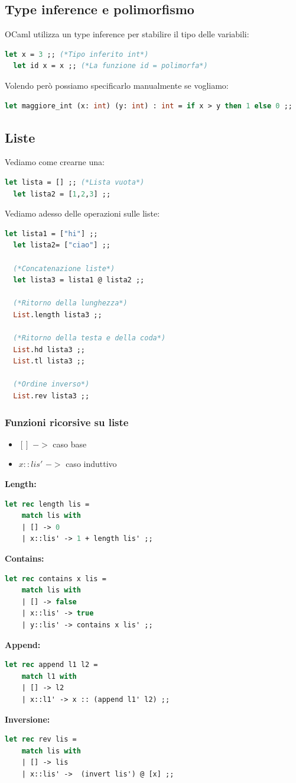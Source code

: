 \documentclass[12pt,a4paper]{article}
\begin{document}
\subsection{Type inference e polimorfismo}
OCaml utilizza un type inference per stabilire il tipo delle variabili:
\begin{lstlisting}[language=OCaml]
  let x = 3 ;; (*Tipo inferito int*)
  let id x = x ;; (*La funzione id = polimorfa*)
\end{lstlisting}
Volendo però possiamo specificarlo manualmente se vogliamo:
\begin{lstlisting}[language=OCaml]
  let maggiore_int (x: int) (y: int) : int = if x > y then 1 else 0 ;;
\end{lstlisting}
\subsection{Liste}
Vediamo come crearne una:
\begin{lstlisting}[language=OCaml]
  let lista = [] ;; (*Lista vuota*)
  let lista2 = [1,2,3] ;;
\end{lstlisting}
Vediamo adesso delle operazioni sulle liste:
\begin{lstlisting}[language=OCaml]
  let lista1 = ["hi"] ;;
  let lista2= ["ciao"] ;;

  (*Concatenazione liste*)
  let lista3 = lista1 @ lista2 ;;

  (*Ritorno della lunghezza*)
  List.length lista3 ;;

  (*Ritorno della testa e della coda*)
  List.hd lista3 ;;
  List.tl lista3 ;;

  (*Ordine inverso*)
  List.rev lista3 ;;
\end{lstlisting}
\subsubsection{Funzioni ricorsive su liste}
\begin{itemize}
  \item $[]$ $->$ caso base
  \item $x::lis'$ $->$ caso induttivo
\end{itemize}
\textbf{Length:}
\begin{lstlisting}[language=OCaml]
  let rec length lis =
    match lis with
    | [] -> 0
    | x::lis' -> 1 + length lis' ;;
\end{lstlisting}
\textbf{Contains:}
\begin{lstlisting}[language=OCaml]
  let rec contains x lis = 
    match lis with
    | [] -> false
    | x::lis' -> true
    | y::lis' -> contains x lis' ;;
\end{lstlisting}
\textbf{Append:}
\begin{lstlisting}[language=OCaml]
  let rec append l1 l2 = 
    match l1 with
    | [] -> l2
    | x::l1' -> x :: (append l1' l2) ;;
\end{lstlisting}
\textbf{Inversione:}
\begin{lstlisting}[language=OCaml]
  let rec rev lis = 
    match lis with
    | [] -> lis
    | x::lis' ->  (invert lis') @ [x] ;;
\end{lstlisting}
\end{document}
